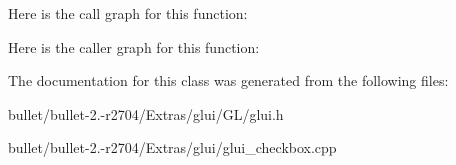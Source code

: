 Here is the call graph for this function\+:




Here is the caller graph for this function\+:




The documentation for this class was generated from the following files\+:\begin{DoxyCompactItemize}
\item 
bullet/bullet-\/2.-\/r2704/\+Extras/glui/\+G\+L/glui.\+h\item 
bullet/bullet-\/2.-\/r2704/\+Extras/glui/glui\+\_\+checkbox.\+cpp\end{DoxyCompactItemize}
